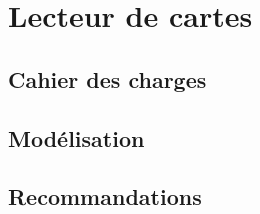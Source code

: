\chapter{Lecteur de cartes}
    \section{Cahier des charges}
    \section{Modélisation}
    \section{Recommandations}
